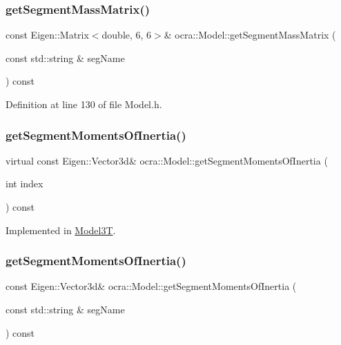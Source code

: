 \subsubsection{\texorpdfstring{get\+Segment\+Mass\+Matrix()}{getSegmentMassMatrix()}\hspace{0.1cm}{\footnotesize\ttfamily [2/2]}}
{\footnotesize\ttfamily const Eigen\+::\+Matrix$<$double, 6, 6$>$\& ocra\+::\+Model\+::get\+Segment\+Mass\+Matrix (\begin{DoxyParamCaption}\item[{const std\+::string \&}]{seg\+Name }\end{DoxyParamCaption}) const\hspace{0.3cm}{\ttfamily [inline]}}



Definition at line 130 of file Model.\+h.

\hypertarget{classocra_1_1Model_ae296f35e785641df23e6cf4fdbb24f8a}{}\label{classocra_1_1Model_ae296f35e785641df23e6cf4fdbb24f8a} 
\subsubsection{\texorpdfstring{get\+Segment\+Moments\+Of\+Inertia()}{getSegmentMomentsOfInertia()}\hspace{0.1cm}{\footnotesize\ttfamily [1/2]}}
{\footnotesize\ttfamily virtual const Eigen\+::\+Vector3d\& ocra\+::\+Model\+::get\+Segment\+Moments\+Of\+Inertia (\begin{DoxyParamCaption}\item[{int}]{index }\end{DoxyParamCaption}) const\hspace{0.3cm}{\ttfamily [pure virtual]}}



Implemented in \hyperlink{classModel3T_abac667ae49c8690ddf20ca1ae0154459}{Model3T}.

\hypertarget{classocra_1_1Model_aadbb1c73724eba41dff3afc805275601}{}\label{classocra_1_1Model_aadbb1c73724eba41dff3afc805275601} 
\subsubsection{\texorpdfstring{get\+Segment\+Moments\+Of\+Inertia()}{getSegmentMomentsOfInertia()}\hspace{0.1cm}{\footnotesize\ttfamily [2/2]}}
{\footnotesize\ttfamily const Eigen\+::\+Vector3d\& ocra\+::\+Model\+::get\+Segment\+Moments\+Of\+Inertia (\begin{DoxyParamCaption}\item[{const std\+::string \&}]{seg\+Name }\end{DoxyParamCaption}) const\hspace{0.3cm}{\ttfamily [inline]}}



